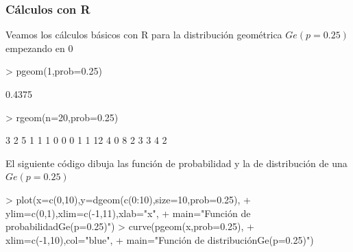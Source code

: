 \documentclass[handout]{beamer}
\theoremstyle{plain}
\theoremstyle{definition}
\begin{document}
\begin{frame}[fragile]
\frametitle{Cálculos con R}
Veamos los cálculos básicos con  R para la distribución geométrica  $Ge(p=0.25)$ empezando en $0$

\begin{Schunk}
\begin{Sinput}
> pgeom(1,prob=0.25)
\end{Sinput}
\begin{Soutput}
[1] 0.4375
\end{Soutput}
\begin{Sinput}
> rgeom(n=20,prob=0.25)
\end{Sinput}
\begin{Soutput}
 [1]  3  2  5  1  1  1  0  0  0  1  1 12  4  0  8  2  3  3  4  2
\end{Soutput}
\end{Schunk}

\end{frame}

\begin{frame}[fragile]

El siguiente código dibuja las función de probabilidad y la de distribución de una  $Ge(p=0.25)$

\begin{Schunk}
\begin{Sinput}
> plot(x=c(0,10),y=dgeom(c(0:10),size=10,prob=0.25),
+   ylim=c(0,1),xlim=c(-1,11),xlab="x",
+   main="Función de probabilidad\n Ge(p=0.25)")
> curve(pgeom(x,prob=0.25),
+   xlim=c(-1,10),col="blue",
+   main="Función de distribución\n Ge(p=0.25)")
\end{Sinput}
\end{Schunk}

\end{frame}


\begin{frame}[fragile]


\end{frame}


\begin{frame}[fragile]


\end{frame}
\end{document}
